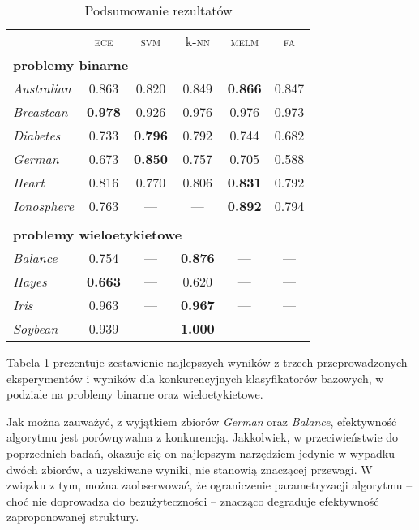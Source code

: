 \FloatBarrier
\begin{table}[ht]
	\caption{Podsumowanie rezultatów}
	\vspace{.5cm}
    \label{tab:podsumowanie}
	\centering
	\begin{tabular}{l>{\color{red}}ccccc}
		& \textsc{ece} & \textsc{svm} & k-\textsc{nn} & \textsc{melm} & \textsc{fa}\\
		\multicolumn{6}{l}{\tiny \bfseries problemy binarne}\\
		\emph{Australian} &0.863 & 0.820 & 0.849 & \textbf{0.866} & 0.847\\
		\emph{Breastcan} & \textbf{0.978} & 0.926 & 0.976 & 0.976 & 0.973\\
		\emph{Diabetes} & 0.733  & \textbf{0.796} & 0.792 & 0.744 & 0.682\\
		\emph{German} & 0.673 & \textbf{0.850} & 0.757 & 0.705 & 0.588\\
		\emph{Heart} & 0.816 & 0.770 & 0.806 & \textbf{0.831} & 0.792\\
		\emph{Ionosphere} & 0.763 & --- & --- & \textbf{0.892} & 0.794\\\\
		\multicolumn{6}{l}{\tiny \bfseries problemy wieloetykietowe}\\
		\emph{Balance} & 0.754 & --- & \textbf{0.876} & --- & ---\\		
		\emph{Hayes} & \textbf{0.663} & --- & 0.620 & --- & ---\\
		\emph{Iris} & 0.963 & --- & \textbf{0.967} & --- & ---\\
		\emph{Soybean} & 0.939 & --- & \textbf{1.000} & --- & ---\\
	\end{tabular}
\end{table}

Tabela \ref{tab:podsumowanie} prezentuje zestawienie najlepszych wyników z trzech przeprowadzonych eksperymentów i wyników dla konkurencyjnych klasyfikatorów bazowych, w podziale na problemy binarne oraz wieloetykietowe.

Jak można zauważyć, z wyjątkiem zbiorów \emph{German} oraz \emph{Balance}, efektywność algorytmu jest porównywalna z konkurencją. Jakkolwiek, w przeciwieństwie do poprzednich badań, okazuje się on najlepszym narzędziem jedynie w wypadku dwóch zbiorów, a uzyskiwane wyniki, nie stanowią znaczącej przewagi. W związku z tym, można zaobserwować, że ograniczenie parametryzacji algorytmu -- choć nie doprowadza do bezużyteczności -- znacząco degraduje efektywność zaproponowanej struktury.